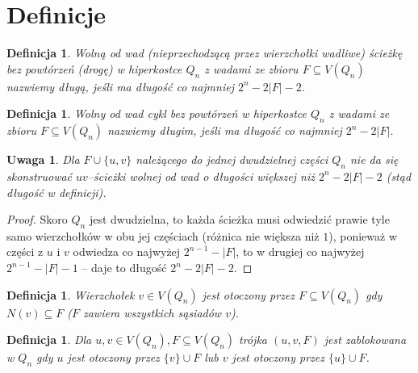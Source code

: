 \documentclass{pracamgr}
\newtheorem{defi}[theorem]{Definicja}
\newtheorem{remark}[theorem]{Uwaga}
\begin{document}
  \section{Definicje}
   \begin{defi}\label{dluga sciezka}
    Wolną od wad (nieprzechodzącą przez wierzchołki wadliwe)
    ścieżkę bez powtórzeń (drogę) w hiperkostce $Q_n$ z wadami ze zbioru $F\subseteq V(Q_n)$ nazwiemy długą, jeśli ma długość co najmniej $2^n-2|F|-2$.
   \end{defi}
   \begin{defi}\label{dlugi cykl}
    Wolny od wad cykl bez powtórzeń w hiperkostce $Q_n$ z wadami ze zbioru $F\subseteq V(Q_n)$ nazwiemy długim, jeśli ma długość co najmniej $2^n-2|F|$.
   \end{defi}
   \begin{remark}\label{dluga sciezka- nie da sie dluzszej}
    Dla $F\cup\{u,v\}$ należącego do jednej dwudzielnej części $Q_n$ nie da się skonstruować $uv$--ścieżki wolnej od wad o długości większej niż $2^n-2|F|-2$
    (stąd długość w definicji).
   \end{remark}
   \begin{proof}
    Skoro $Q_n$ jest dwudzielna, to każda ścieżka musi odwiedzić prawie tyle samo wierzchołków w obu jej częściach (różnica nie większa niż $1$),
    ponieważ w części z $u$ i $v$ odwiedza co najwyżej $2^{n-1}-|F|$, to w drugiej co najwyżej $2^{n-1}-|F|-1$ -- daje to długość $2^n-2|F|-2$.
   \end{proof}
   \begin{defi}\label{wierzcholek otoczony}
    Wierzchołek $v\in V(Q_n)$ jest \emph{otoczony} przez $F\subseteq V(Q_n)$ gdy $N(v)\subseteq F$ ($F$ zawiera wszystkich sąsiadów $v$).
   \end{defi}
   \begin{defi}\label{para zablokowana}
    Dla $u,v\in V(Q_n), F\subseteq V(Q_n)$
    trójka $(u,v,F)$ jest \emph{zablokowana w $Q_n$} gdy $u$ jest otoczony przez $\{v\}\cup F$ lub $v$ jest otoczony przez $\{u\}\cup F$.
   \end{defi}
\end{document}
